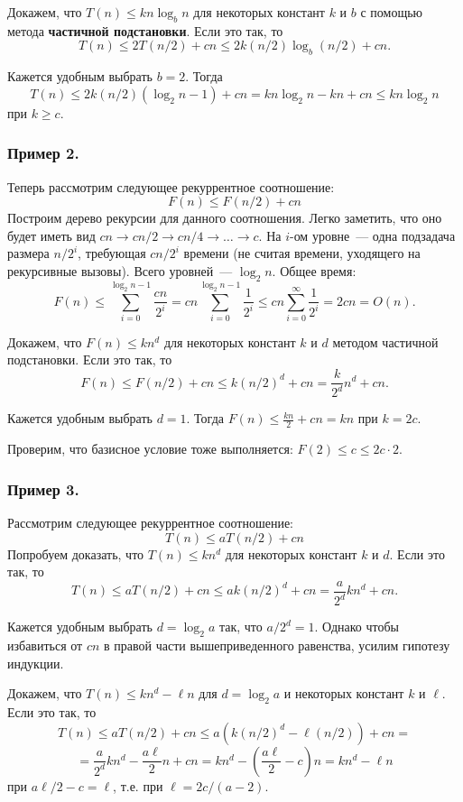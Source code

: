 \documentclass[a4paper,12pt]{article}
\begin{document}
Докажем, что $T(n) \leq kn \log_b n$ для некоторых констант $k$ и $b$ с помощью метода \textbf{частичной подстановки}. Если это так, то
\[T(n) \leq 2T(n/2) + cn \leq 2k(n/2)\log_b(n/2) + cn.\]

Кажется удобным выбрать $b = 2$. Тогда
\[T(n) \leq 2k(n/2)(\log_2n - 1) + cn = kn\log_2n - kn + cn \leq kn\log_2 n\]
при $k \geq c$.

\subsubsection{Пример 2.}

Теперь рассмотрим следующее рекуррентное соотношение: \[F(n) \leqslant F(n/2) + cn\]
Построим дерево рекурсии для данного соотношения. Легко заметить, что оно будет иметь вид \(cn \to cn/2 \to cn/4 \to \ldots \to c\). На $i$-ом уровне~--- одна подзадача размера $n / 2^i$, требующая $cn / 2^i$ времени (не считая времени, уходящего на рекурсивные вызовы). Всего уровней~--- $\log_2 n$. Общее время:
\[F(n) \leq \sum_{i=0}^{\log_2n - 1}\frac{cn}{2^i} = cn\sum_{i=0}^{\log_2n - 1}\frac{1}{2^i} \leq cn \sum_{i=0}^{\infty}\frac{1}{2^i} = 2cn = O(n).\]

Докажем, что $F(n) \leq kn^d$ для некоторых констант $k$ и $d$ методом частичной подстановки. Если это так, то
\[F(n) \leq F(n/2) + cn \leq k(n/2)^d + cn = \frac{k}{2^d}n^d + cn.\]

Кажется удобным выбрать $d = 1$. Тогда \(F(n) \leq \frac{kn}{2} + cn = kn\) при $k = 2c$.

Проверим, что базисное условие тоже выполняется: $F(2) \leq c \leq 2c \cdot 2$.

\subsubsection{Пример 3.}
Рассмотрим следующее рекуррентное соотношение:
\[T(n) \leq aT(n/2) + cn\]
Попробуем доказать, что $T(n) \leq kn^d$ для некоторых констант $k$ и $d$. Если это так, то
\[T(n) \leq aT(n/2) + cn \leq ak(n/2)^d + cn = \frac{a}{2^d}kn^d + cn.\]

Кажется удобным выбрать $d = \log_2 a$ так, что $a / 2^d = 1$. Однако чтобы избавиться от $cn$ в правой части вышеприведенного равенства, усилим гипотезу индукции.

Докажем, что $T(n) \leq kn^d - \ell n$ для $d = \log_2a$ и некоторых констант $k$ и $\ell$. Если это так, то
\[T(n) \leq aT(n/2) + cn \leq a(k(n/2)^d - \ell(n/2)) + cn =\]
\[= \frac{a}{2^d}kn^d - \frac{a\ell}{2}n + cn = kn^d - (\frac{a\ell}{2} - c)n = kn^d - \ell n\]
при $a\ell/2 - c = \ell$, т.е. при $\ell = 2c / (a - 2)$.
\end{document}
